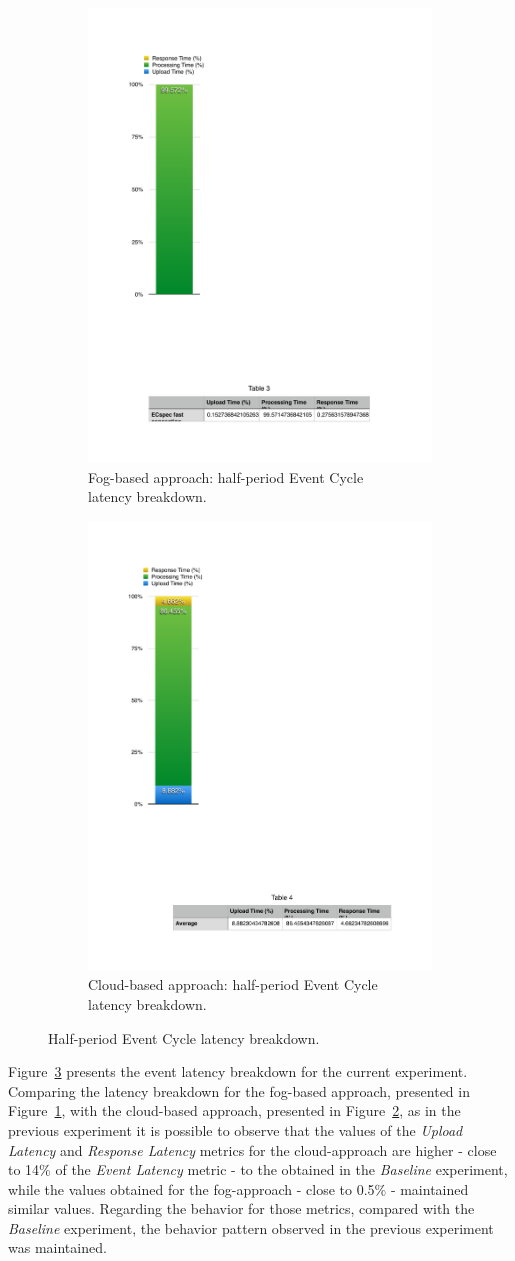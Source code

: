 \begin{figure}[ht!]
  \centering
  \begin{subfigure}{.5\textwidth}
    \centering
    \includegraphics[width=.4\linewidth]{./images/ecspec_fast_local_breakdown}
    \caption{Fog-based approach: half-period Event Cycle\\ latency breakdown.}
    \label{fig:ecspec_fast_local}
  \end{subfigure}%
  \begin{subfigure}{.5\textwidth}
    \centering
    \includegraphics[width=.4\linewidth]{./images/ecspec_fast_cloud_breakdown}
    \caption{Cloud-based approach: half-period Event Cycle\\ latency breakdown.}
    \label{fig:ecspec_fast_cloud}
  \end{subfigure}
  \caption{Half-period Event Cycle latency breakdown.}
  \label{fig:ecspec_fast_breakdown}
\end{figure}

Figure~\ref{fig:ecspec_fast_breakdown} presents the event latency breakdown for the current experiment.
Comparing the latency breakdown for the fog-based approach, presented in Figure~\ref{fig:ecspec_fast_local},
with the cloud-based approach, presented in Figure~\ref{fig:ecspec_fast_cloud}, as in the previous experiment
it is possible to observe that the values of the \textit{Upload Latency} and \textit{Response Latency}
metrics for the cloud-approach are higher - close to 14$\%$ of the \textit{Event Latency} metric - to
the obtained in the \textit{Baseline} experiment, while the values obtained for the fog-approach
- close to 0.5$\%$ - maintained similar values. Regarding the behavior for those metrics, compared
with the \textit{Baseline} experiment, the behavior pattern observed in the previous experiment
was maintained.

